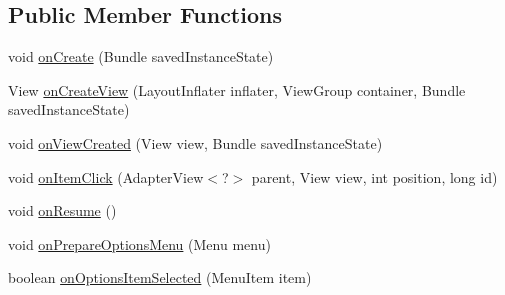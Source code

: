 \subsection*{Public Member Functions}
\begin{DoxyCompactItemize}
\item 
void \hyperlink{classorg_1_1buildmlearn_1_1toolkit_1_1fragment_1_1DraftsFragment_a1e05ae9cd797e7a6ab870fd56cb67b21}{on\+Create} (Bundle saved\+Instance\+State)
\item 
View \hyperlink{classorg_1_1buildmlearn_1_1toolkit_1_1fragment_1_1DraftsFragment_a331f31f828107dbad75e8674799d6de6}{on\+Create\+View} (Layout\+Inflater inflater, View\+Group container, Bundle saved\+Instance\+State)
\item 
void \hyperlink{classorg_1_1buildmlearn_1_1toolkit_1_1fragment_1_1DraftsFragment_a92519c690ed616ac403cbc35113591e4}{on\+View\+Created} (View view, Bundle saved\+Instance\+State)
\item 
void \hyperlink{classorg_1_1buildmlearn_1_1toolkit_1_1fragment_1_1DraftsFragment_a818bb6da97190d0bde6225fc0cac1015}{on\+Item\+Click} (Adapter\+View$<$?$>$ parent, View view, int position, long id)
\item 
void \hyperlink{classorg_1_1buildmlearn_1_1toolkit_1_1fragment_1_1DraftsFragment_abe0d05a64fb5e0dd1c450953cf6805c1}{on\+Resume} ()
\item 
void \hyperlink{classorg_1_1buildmlearn_1_1toolkit_1_1fragment_1_1DraftsFragment_a19a18a03621f26f5d04d6d9e677fccec}{on\+Prepare\+Options\+Menu} (Menu menu)
\item 
boolean \hyperlink{classorg_1_1buildmlearn_1_1toolkit_1_1fragment_1_1DraftsFragment_aaedb7f7c94ed2b6c2e1c414485cafc4d}{on\+Options\+Item\+Selected} (Menu\+Item item)
\end{DoxyCompactItemize}
